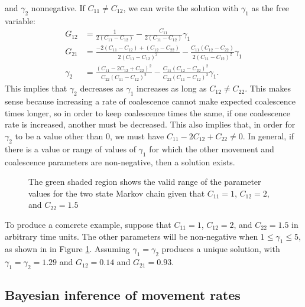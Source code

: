 \documentclass{article}
\begin{document}
and $\gamma_2$ nonnegative.
If $C_{11} \neq C_{12}$, 
we can write the solution with $\gamma_1$ as the free variable:
\begin{align*}
G_{12} &= \frac{1}{2(C_{11} - C_{12})} - \frac{C_{11}}{2(C_{11} - C_{12})}\gamma_1 \\
G_{21} &= \frac{-2(C_{11} - C_{12}) + (C_{12} - C_{22})}{2(C_{11} - C_{12})^2}
	- \frac{C_{11}(C_{12} - C_{22})}{2(C_{11} - C_{12})^2}\gamma_1 \\
\gamma_2 &= \frac{(C_{11} - 2C_{12} + C_{22})^2}{C_{22}(C_{11} - C_{12})^2}
	- \frac{C_{11}(C_{12} - C_{22})^2}{C_{22}(C_{11} - C_{12})^2}\gamma_1.
\end{align*}
This implies that $\gamma_2$ decreases as $\gamma_1$ increases as long as $C_{12} \neq C_{22}$.
This makes sense because
increasing a rate of coalescence cannot make expected coalescence times longer,
so in order to keep coalescence times the same,
if one coalescence rate is increased, another must be decreased.
This also implies that, in order for $\gamma_2$ to be a value other than $0$, 
we must have $C_{11} - 2C_{12} + C_{22} \neq 0$.
In general, if there is a value or range of values of $\gamma_1$
for which the other movement and coalescence parameters are non-negative,
then a solution exists.

\begin{figure}
\centering
\caption{The green shaded region shows 
	the valid range of the parameter values
	for the two state Markov chain given that
	$C_{11}=1$, $C_{12}=2$, and $C_{22}=1.5$}
\label{fig:valid_range}
\end{figure}

To produce a comcrete example, suppose that
$C_{11} = 1$, $C_{12} = 2$, and $C_{22} = 1.5$ in arbitrary time units.
The other parameters will be non-negative 
when $1 \leq \gamma_1 \leq 5$,
as shown in in Figure \ref{fig:valid_range}.
Assuming $\gamma_1 = \gamma_2$ produces a unique solution, 
with $\gamma_1 = \gamma_2 = 1.29$ and $G_{12} = 0.14$ and $G_{21} = 0.93$.


\subsection*{Bayesian inference of movement rates}
\end{document}
